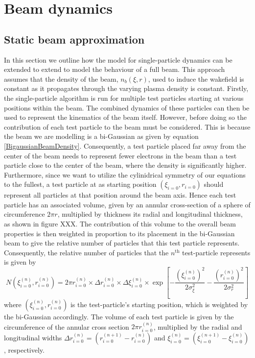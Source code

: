 \section{Beam dynamics}
\subsection{Static beam approximation}
In this section we outline how the model for single-particle dynamics can be extended to extend to model the behaviour of a full beam. This approach assumes that the density of the beam, $n_b(\xi,r)$, used to induce the wakefield is constant as it propagates through the varying plasma density is constant.  Firstly, the single-particle algorithm is run for multiple test particles starting at various positions within the beam. The combined dynamics of these particles can then be used to represent the kinematics of the beam itself. However, before doing so the contribution of each test particle to the beam must be considered. This is because the beam we are modelling is a bi-Gaussian as given by equation \ref{BigaussianBeamDensity}. Consequently, a test particle placed far away from the center of the beam needs to represent fewer electrons in the beam than a test particle close to the center of the beam, where the density is significantly higher. Furthermore, since we want to utilize the cylinidrical symmetry of our equations to the fullest, a test particle at as starting position $(\xi_{i=0},r_{i=0})$ should represent all particles at that position around the beam axis. Hence each test particle has an associated volume, given by an annular cross-section of a sphere of circumference $2\pi r$, multiplied by thickness its radial and longitudinal thickness, as shown in figure XXX. The contribution of this volume to the overall beam properties is then weighted in proportion to its placement in the bi-Gaussian beam to give the relative number of particles that this test particle represents. Consequently, the relative number of particles that the $n^{\text{th}}$ test-particle represents is given by
\begin{equation}
N\left(\xi_{i=0}^{(n)},r_{i=0}^{(n)}\right)=2\pi r_{i=0}^{(n)}\times\Delta r_{i=0}^{(n)}\times\Delta \xi_{i=0}^{(n)}\times\exp[-\frac{\left(\xi_{i=0}^{(n)}\right)^2}{2\sigma_{\xi}^2}-\frac{\left(r_{i=0}^{(n)}\right)^2}{2\sigma_{r}^2}]
\end{equation}
where $(\xi_{i=0}^{(n)},r_{i=0}^{(n)})$ is the test-particle's starting position, which is weighted by the bi-Gaussian accordingly. The volume of each test particle is given by the circumference of the annular cross section $2\pi r_{i=0}^{(n)}$, multiplied by the radial and longitudinal widths $\Delta r_{i=0}^{(n)}=( r_{i=0}^{(n+1)}-r_{i=0}^{(n)})$ and $\xi_{i=0}^{(n)}=( \xi_{i=0}^{(n+1)}-\xi_{i=0}^{(n)})$, respectively. 
